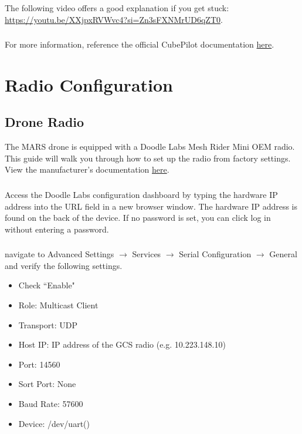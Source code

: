             \subsubsection{} The following video offers a good explanation if you get stuck:
            \textcolor{blue}{\href{https://custom.ardupilot.org/add_build}{https://youtu.be/XXjpxRVWvc4?si=Zn3sFXNMrUD6qZT0}}.
            \subsubsection{} For more information, reference the official CubePilot documentation \textcolor{blue}{\href{https://docs.cubepilot.org/user-guides/cube-id/cube-id}{here}}. 
            

    \section{Radio Configuration}
        \subsection{Drone Radio}
        The MARS drone is equipped with a Doodle Labs Mesh Rider Mini OEM radio. This guide will walk you through how to set up the radio from factory settings. View the manufacturer's documentation \textcolor{blue}{\href{https://techlibrary.doodlelabs.com/mini-oem-dual-band-mesh-rider-radio-915-mhz-and-2450-mhz-ism-bands}{here}}.
        
            \subsubsection{} Access the Doodle Labs configuration dashboard by typing the hardware IP address into the URL field in a new browser window. The hardware IP address is found on the back of the device. If no password is set, you can click log in without entering a password. 
            \subsubsection{} navigate to Advanced Settings $\rightarrow$ Services $\rightarrow$ Serial Configuration $\rightarrow$ General and verify the following settings.
                \begin{itemize}
                    \item Check ``Enable"
                    \item Role: Multicast Client
                    \item Transport: UDP
                    \item Host IP: IP address of the GCS radio (e.g. 10.223.148.10)
                    \item Port: 14560
                    \item Sort Port: None
                    \item Baud Rate: 57600
                    \item Device: /dev/uart() 
                \end{itemize} 
